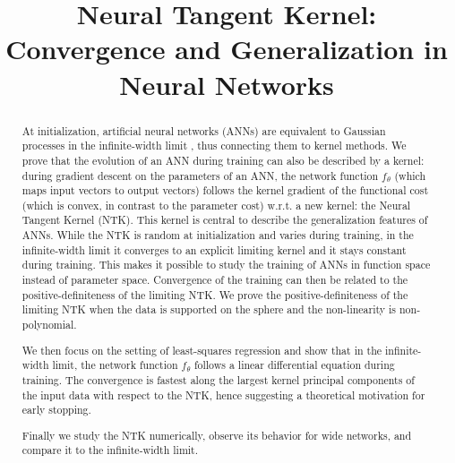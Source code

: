 \title{Neural Tangent Kernel: Convergence and Generalization in Neural Networks}

\begin{abstract}
At initialization, artificial neural networks (ANNs) are equivalent to Gaussian processes in the infinite-width limit \cite{Neal1996,Daniely, Matthews2017GaussianProcess,Lee2017,Matthews2018GaussianProcess}, thus connecting them to kernel methods. We prove that the evolution of an ANN during training can also be described by a kernel: during gradient descent on the parameters of an ANN, the network function $f_\theta$ (which maps input vectors to output vectors) follows the kernel gradient of the functional cost (which is convex, in contrast to the parameter cost) w.r.t. a new kernel: the Neural Tangent Kernel (NTK). This kernel is central to describe the generalization features of ANNs. While the NTK is random at initialization and varies during training, in the infinite-width limit it converges to an explicit limiting kernel and it stays constant during training. This makes it possible to study the training of ANNs in function space instead of parameter space. Convergence of the training can then be related to the positive-definiteness of the limiting NTK. We prove the positive-definiteness of the limiting NTK when the data is supported on the sphere and the non-linearity is non-polynomial.

We then focus on the setting of least-squares regression and show that in the infinite-width limit, the network function $f_\theta$ follows a linear differential equation during training. The convergence is fastest along the largest kernel principal components of the input data with respect to the NTK, hence suggesting a theoretical motivation for early stopping.

Finally we study the NTK numerically, observe its behavior for wide networks, and compare it to the infinite-width limit.
\end{abstract}


